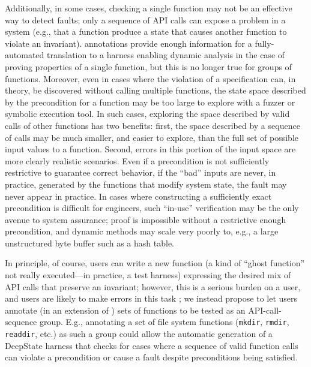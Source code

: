 Additionally, in some cases, checking a single function may not be an effective way to detect faults; only a sequence of API calls can expose a problem in a system (e.g., that a function produce a state that causes another function to violate an invariant).  \acsl annotations provide enough information for a fully-automated translation to a harness enabling dynamic analysis in the case of proving properties of a single function, but this is no longer true for groups of functions.  Moreover, even in cases where the violation of a specification can, in theory, be discovered without calling multiple functions, the state space described by the precondition for a function may be too large to explore with a fuzzer or symbolic execution tool.  In such cases, exploring the space described by valid calls of other functions has two benefits:  first, the space described by a sequence of calls may be much smaller, and easier to explore, than the full set of possible input values to a function.  Second, errors in this portion of the input space are more clearly realistic scenarios.  Even if a precondition is not sufficiently restrictive to guarantee correct behavior, if the ``bad'' inputs are never, in practice, generated by the functions that modify system state, the fault may never appear in practice.  In cases where constructing a sufficiently exact precondition is difficult for engineers, such ``in-use'' verification may be the only avenue to system assurance; proof is impossible without a restrictive enough precondition, and dynamic methods may scale very poorly to, e.g., a large unstructured byte buffer such as a hash table.

In principle, of course, users can write a new function (a kind of ``ghost function'' not really executed---in practice, a test harness) expressing the desired mix of API calls that preserve an invariant; however, this is a serious burden on a user, and users are likely to make errors in this task \cite{CFV08,AMAI,scriptstospecs,groce2015verified,groce2018verified}; we instead propose to let users annotate (in an extension of \acsl) sets of functions to be tested as an API-call-sequence group.  E.g., annotating a set of file system functions ({\tt mkdir}, {\tt rmdir}, {\tt readdir}, etc.) as such a group could allow the automatic generation of a DeepState harness that checks for cases where a sequence of valid function calls can violate a precondition or cause a fault despite preconditions being satisfied.

